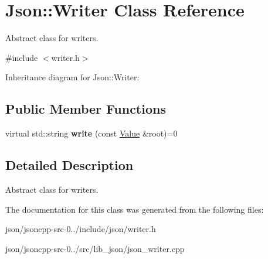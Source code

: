 \hypertarget{class_json_1_1_writer}{\section{Json\+:\+:Writer Class Reference}
\label{class_json_1_1_writer}
}


Abstract class for writers.  




{\ttfamily \#include $<$writer.\+h$>$}



Inheritance diagram for Json\+:\+:Writer\+:
\subsection*{Public Member Functions}
\begin{DoxyCompactItemize}
\item 
\hypertarget{class_json_1_1_writer_a7b2273a4ffd6f32b369ac8a53b7b5a0d}{virtual std\+::string {\bfseries write} (const \hyperlink{class_json_1_1_value}{Value} \&root)=0}\label{class_json_1_1_writer_a7b2273a4ffd6f32b369ac8a53b7b5a0d}

\end{DoxyCompactItemize}


\subsection{Detailed Description}
Abstract class for writers. 

The documentation for this class was generated from the following files\+:\begin{DoxyCompactItemize}
\item 
json/jsoncpp-\/src-\/0../include/json/writer.\+h\item 
json/jsoncpp-\/src-\/0../src/lib\+\_\+json/json\+\_\+writer.\+cpp\end{DoxyCompactItemize}
